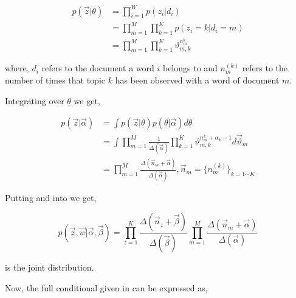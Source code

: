 \begin{align}
 p(\vec{z}|\underline{\theta})		& = \prod_{i=1}^{W} p(z_i|d_i) \\
					& = \prod_{m=1}^{M} \prod_{k=1}^{K} p(z_i=k|d_i=m) \\
					& = \prod_{m=1}^{M} \prod_{k=1}^{K} \vartheta_{m,k}^{n_m^{k}} \label{eqn:zgiventheta}
\end{align}

where, \(d_i\) refers to the document a word \(i\) belongs to and \(n_m^{(k)}\) refers to the number of times that topic \(k\) has been observed
with a word of document \(m\).

Integrating  over \(\underline{\theta}\) we get,

\begin{align}
 p(\vec{z}|\vec{\alpha})		& = \int p(\vec{z}|\underline{\theta})p(\underline{\theta}|\vec{\alpha})d\underline{\theta} \\
					& = \int \prod_{m=1}^{M} \frac{1}{\Delta(\vec{\alpha})} \prod_{k=1}^{K} \vartheta_{m,k}^{n_m^{k} + \alpha_k - 1} d\vec{\vartheta}_m \\
					& = \prod_{m=1}^{M} \frac{\Delta(\vec{n}_m+\vec{\alpha})}{\Delta(\vec{\alpha})}, \vec{n}_m = \{n_{m}^{(k)}\}_{k=1 \cdots K}
					\label{eqn:zgivenalpha}
\end{align}

Putting  and  into  we get,

\begin{equation}\label{eqn:jointdistribution}
p(\vec{z},\vec{w}|\vec{\alpha},\vec{\beta}) = \prod_{z=1}^{K} \frac{\Delta(\vec{n}_z+\vec{\beta})}{\Delta(\vec{\beta})} \prod_{m=1}^{M} \frac{\Delta(\vec{n}_m+\vec{\alpha})}{\Delta(\vec{\alpha})}
\end{equation}

 is the joint distribution. 

Now, the full conditional given in  can be expressed as,
 
